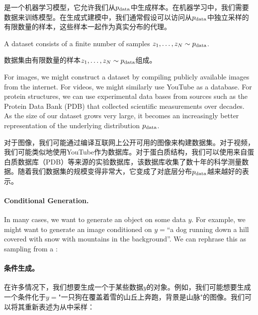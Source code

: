 是一个机器学习模型，它允许我们从$p_{\rm{data}}$中生成样本。在机器学习中，我们需要数据来训练模型。在生成式建模中，我们通常假设可以访问从$p_{\rm{data}}$中独立采样的有限数量的样本，这些样本一起作为真实分布的代理。

\begin{ideabox}[Dataset]
    A dataset consists of a finite number of samples $z_1, \dots, z_N \sim p_{\rm{data}}$.
    
    数据集由有限数量的样本$z_1, \dots, z_N \sim p_{\rm{data}}$组成。
\end{ideabox}
For images, we might construct a dataset by compiling publicly available images from the internet. For videos, we might similarly use YouTube as a database. For protein structures, we can use experimental data bases from sources such as the Protein Data Bank (PDB) that collected scientific measurements over decades. As the size of our dataset grows very large, it becomes an increasingly better representation of the underlying distribution $p_{\rm{data}}$.

对于图像，我们可能通过编译互联网上公开可用的图像来构建数据集。对于视频，我们可能类似地使用YouTube作为数据库。对于蛋白质结构，我们可以使用来自蛋白质数据库（PDB）等来源的实验数据库，该数据库收集了数十年的科学测量数据。随着我们数据集的规模变得非常大，它变成了对底层分布$p_{\rm{data}}$越来越好的表示。

\paragraph{Conditional Generation.} In many cases, we want to generate an object  on some data $y$. For example, we might want to generate an image conditioned on $y=$``a dog running down a hill covered with snow with mountains in the background''. We can rephrase this as sampling from a :

\paragraph{条件生成。} 在许多情况下，我们想要生成一个于某些数据$y$的对象。例如，我们可能想要生成一个条件化于$y=$"一只狗在覆盖着雪的山丘上奔跑，背景是山脉"的图像。我们可以将其重新表述为从中采样：

